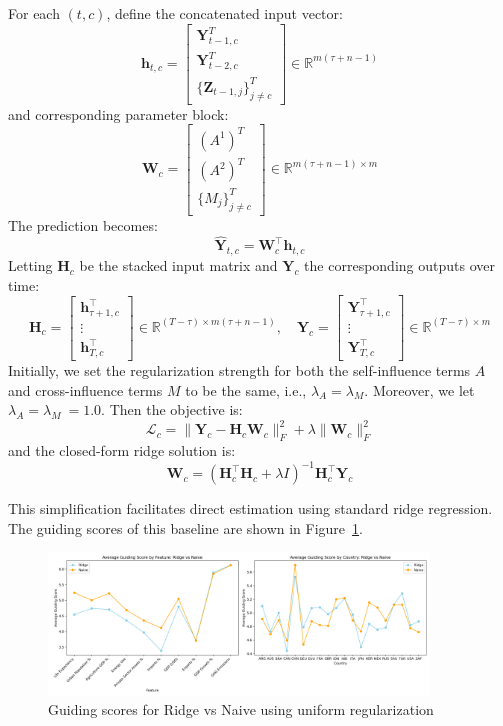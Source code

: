 \documentclass[12pt]{article}
\begin{document}
For each $(t, c)$, define the concatenated input vector:
\[
\mathbf{h}_{t,c} = \begin{bmatrix}
\mathbf{Y}_{t-1,c}^T \\
\mathbf{Y}_{t-2,c}^T \\
\{\mathbf{Z}_{t-1,j}\}_{j \ne c}^T
\end{bmatrix}
\in \mathbb{R}^{m(\tau + n - 1)}
\]
and corresponding parameter block:
\[
\mathbf{W}_c = \begin{bmatrix}
(A^1)^T \\
(A^2)^T \\
\{M_j\}_{j \ne c}^T
\end{bmatrix}
\in \mathbb{R}^{m(\tau + n - 1) \times m}
\]
The prediction becomes:
\[
\hat{\mathbf{Y}}_{t,c} = \mathbf{W}_c^\top \mathbf{h}_{t,c}
\]
Letting $\mathbf{H}_c$ be the stacked input matrix and $\mathbf{Y}_c$ the corresponding outputs over time:
\[
\mathbf{H}_c = \begin{bmatrix}
\mathbf{h}_{\tau+1, c}^\top \\
\vdots \\
\mathbf{h}_{T, c}^\top
\end{bmatrix}
\in \mathbb{R}^{(T - \tau) \times m(\tau + n - 1)}, \quad
\mathbf{Y}_c = \begin{bmatrix}
\mathbf{Y}_{\tau+1, c}^\top \\
\vdots \\
\mathbf{Y}_{T, c}^\top
\end{bmatrix}
\in \mathbb{R}^{(T - \tau) \times m}
\]
Initially, we set the regularization strength for both the self-influence terms \( A \) and cross-influence terms \( M \) to be the same, i.e., \(\lambda_A = \lambda_M\).
Moreover, we let \(\lambda_A = \lambda_M\ = 1.0\).
Then the objective is:
\[
\mathcal{L}_c = \| \mathbf{Y}_c - \mathbf{H}_c \mathbf{W}_c \|_F^2 + \lambda \| \mathbf{W}_c \|_F^2
\]
and the closed-form ridge solution is:
\[
\mathbf{W}_c = (\mathbf{H}_c^\top \mathbf{H}_c + \lambda I)^{-1} \mathbf{H}_c^\top \mathbf{Y}_c
\]

This simplification facilitates direct estimation using standard ridge regression. The guiding scores of this baseline are shown in Figure~\ref{fig:guiding_score_ridge}.

\begin{figure}[H]
  \centering
  \includegraphics[width=0.9\textwidth]{guiding_score_ridge.png}
  \caption{Guiding scores for Ridge vs Naive using uniform regularization}
  \label{fig:guiding_score_ridge}
\end{figure}
\end{document}
